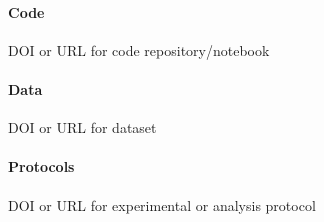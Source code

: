 \documentclass[10pt,a4paper]{article} %
\begin{document}
\paragraph{Code}
\begin{enumerate}[label={[\arabic*]}]
    \item DOI or URL for code repository/notebook
\end{enumerate}

\paragraph{Data}
\begin{enumerate}[label={[\arabic*]}]
    \item DOI or URL for dataset
\end{enumerate}

\paragraph{Protocols}
\begin{enumerate}[label={[\arabic*]}]
    \item DOI or URL for experimental or analysis protocol
\end{enumerate}
\end{document}
